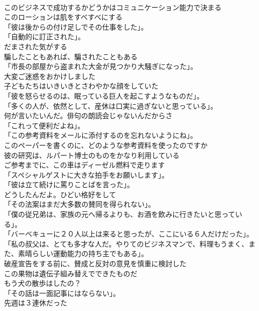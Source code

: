 \documentclass[8pt]{extreport}
\begin{document}
\begin{CJK}{UTF8}{min}
\\	このビジネスで成功するかどうかはコミュニケーション能力で決まる	
\\	このローションは肌をすべすべにする	
\\	「彼は後からの付け足しでその仕事をした」。	
\\	「自動的に訂正された」。	
\\	だまされた気がする	
\\	騙したこともあれば、騙されたこともある	
\\	「市長の部屋から盗まれた大金が見つかり大騒ぎになった」。	
\\	大変ご迷惑をおかけしました	
\\	子どもたちはいきいきとさわやかな顔をしていた	
\\	「彼を怒らせるのは、眠っている巨人を起こすようなものだ」。	
\\	「多くの人が、依然として、産休は口実に過ぎないと思っている」。	
\\	何が言いたいんだ。俳句の朗読会じゃないんだからさ	
\\	「これって便利だよね」。	
\\	「この参考資料をメールに添付するのを忘れないようにね」。	
\\	このペーパーを書くのに、どのような参考資料を使ったのですか	
\\	彼の研究は、ルパート博士のものをかなり利用している	
\\	ご参考までに、この車はディーゼル燃料で走ります	
\\	「スペシャルゲストに大きな拍手をお願いします」。	
\\	「彼は立て続けに罵りことばを言った」。	
\\	どうしたんだよ。ひどい格好をして	
\\	「その法案はまだ大多数の賛同を得られない」。	
\\	「僕の従兄弟は、家族の元へ帰るよりも、お酒を飲みに行きたいと思っている」。	
\\	「バーベキューに２０人以上は来ると思ったが、ここにいる６人だけだった」。	
\\	「私の叔父は、とても多才な人だ。やりてのビジネスマンで、料理もうまく、また、素晴らしい運動能力の持ち主でもある」。	
\\	破産宣告をする前に、賛成と反対の意見を慎重に検討した	
\\	この果物は遺伝子組み替えでできたものだ	
\\	もう犬の散歩はしたの？	
\\	「その話は一面記事にはならない」。	
\\	先週は３連休だった	

\end{CJK}
\end{document}
